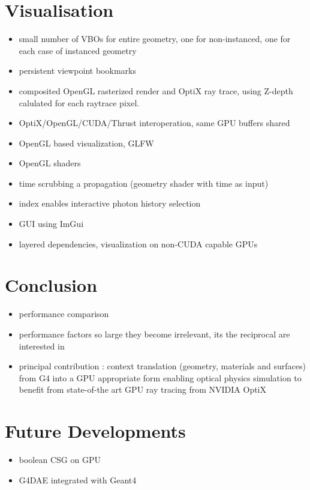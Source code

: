 \documentclass[a4paper]{jpconf}
\begin{document}
\section{Visualisation}

\begin{itemize}
\item small number of VBOs for entire geometry, one for non-instanced, one for each case of instanced geometry
\item persistent viewpoint bookmarks 
\item composited OpenGL rasterized render and OptiX ray trace, using Z-depth calulated for each raytrace pixel.
\item OptiX/OpenGL/CUDA/Thrust interoperation, same GPU buffers shared
\item OpenGL based visualization, GLFW
\item OpenGL shaders
\item time scrubbing a propagation (geometry shader with time as input)
\item index enables interactive photon history selection
\item GUI using ImGui\cite{ImGui}
\item layered dependencies, visualization on non-CUDA capable GPUs
\end{itemize}


\section{Conclusion}

\begin{itemize}
\item performance comparison
\item performance factors so large they become irrelevant, its the reciprocal are interested in 
\item principal contribution : context translation (geometry, materials and surfaces) from G4 into a GPU appropriate form
      enabling optical physics simulation to benefit from state-of-the art GPU ray tracing from NVIDIA OptiX
\end{itemize}


\section{Future Developments}

\begin{itemize}
\item boolean CSG on GPU
\item G4DAE integrated with Geant4
\end{itemize}
\end{document}
